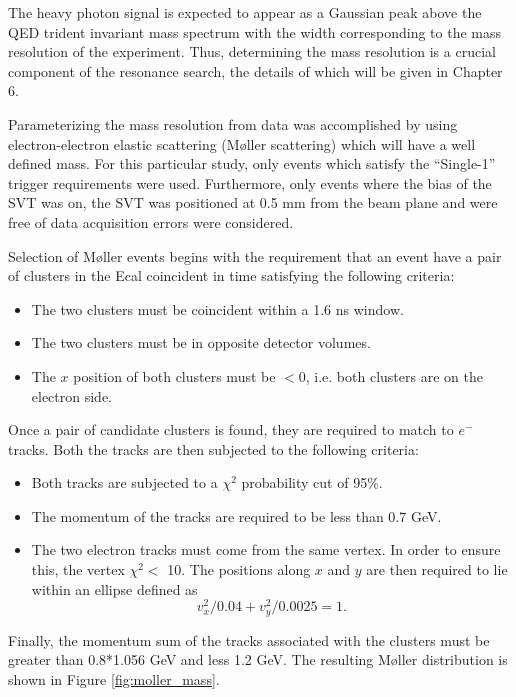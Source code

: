 The heavy photon signal is expected to appear as a Gaussian peak above the QED 
trident invariant mass spectrum with the width corresponding to the mass 
resolution of the experiment.  Thus, determining the mass resolution is a crucial
component of the resonance search, the details of which will be given in Chapter 6.

Parameterizing the mass resolution from data was accomplished by using electron-electron
elastic scattering (M\o ller scattering) which will have a well defined mass.
For this particular study, only events which satisfy the ``Single-1'' trigger 
requirements were used.  Furthermore, only events where the bias of the SVT was 
on, the SVT was positioned at 0.5 mm from the beam plane and were free of 
data acquisition errors were considered.

Selection of M\o ller events begins with the requirement that an event have a
pair of clusters in the Ecal coincident in time satisfying the following criteria:
\begin{itemize}
    \item The two clusters must be coincident within a 1.6 ns window.
    \item The two clusters must be in opposite detector volumes.
    \item The $x$ position of both clusters must be $<0$, i.e. both clusters
          are on the electron side.
\end{itemize}
Once a pair of candidate clusters is found, they are required to match to 
$e^-$ tracks.  Both the tracks are then subjected to the following criteria:
\begin{itemize}
    \item Both tracks are subjected to a $\chi^{2}$ probability cut of 95\%.
    \item The momentum of the tracks are required to be less than 0.7 GeV.
    \item The two electron tracks must come from the same vertex.  In order to
          ensure this, the vertex $\chi^2 <$ 10. The positions along $x$ and $y$
          are then required to lie within an ellipse defined as
          \[
                v_x^2/0.04 + v_y^2/0.0025  = 1.
          \]
\end{itemize}
Finally, the momentum sum of the tracks associated with the clusters must be
greater than 0.8*1.056 GeV and less 1.2 GeV.  The resulting M\o ller distribution
is shown in Figure \ref{fig:moller_mass}. 

